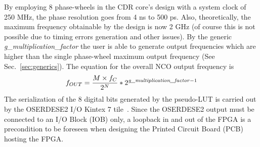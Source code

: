 \documentclass[11pt]{article}
\renewcommand{\>}{\rangle} \renewcommand{\emptyset}{\varnothing}
\begin{document}
By employing 8 phase-wheels in the CDR core's design with a system clock of 250
MHz, the phase resolution goes from 4 ns to 500 ps. Also, theoretically, the
maximum frequency obtainable by the design is now 2 GHz (of course this is not
possible due to timing errors generation and other issues). By the generic
\textit{g\_multiplication\_factor} the user is able to generate output
frequencies which are higher than the single phase-wheel maximum output
frequency (See Sec.~\ref{sec:generics}). The equation for the overall NCO output
frequency is
\begin{equation}
  f_{OUT} = \frac{M \times f_C}{2^N} * 2^{\text{\textit{g\_multiplication\_factor}} - 1}
  \label{eq:f_out_mult}
\end{equation}
The serialization of the 8 digital bits generated by the pseudo-LUT is carried
out by the OSERDESE2 I/O Kintex 7 tile~\cite{ref:serdes}. Since the OSERDESE2
output must be connected to an I/O Block (IOB) only, a loopback in and out of
the FPGA is a precondition to be foreseen when designing the Printed Circuit
Board (PCB) hosting the FPGA.\\
\end{document}
